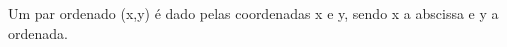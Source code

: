 \documentclass[preview]{standalone}
\begin{document}
\begin{center}
Um par ordenado (x,y) é dado pelas coordenadas x e y, sendo x a abscissa e y a ordenada.
\end{center}
\end{document}
